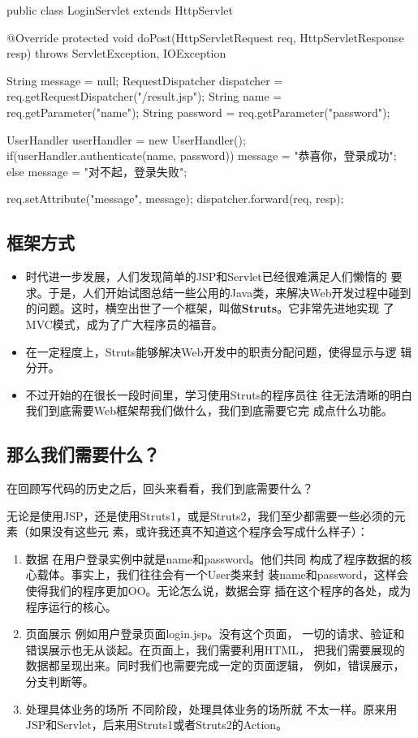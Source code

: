 \begin{javaCode}
  public class LoginServlet extends HttpServlet {
    
    @Override
    protected void doPost(HttpServletRequest req, HttpServletResponse resp) 
    throws ServletException, IOException {
      String message = null;
      RequestDispatcher dispatcher = req.getRequestDispatcher("/result.jsp");
      String name = req.getParameter("name");
      String password = req.getParameter("password");
      
      UserHandler userHandler = new UserHandler();
      if(userHandler.authenticate(name, password)) {
        message = "恭喜你，登录成功";
      } else {
        message = "对不起，登录失败";
      }
      
      req.setAttribute("message", message);
      dispatcher.forward(req, resp);
    }
  }
\end{javaCode}

\subsection{框架方式}

\begin{itemize}
\item 时代进一步发展，人们发现简单的JSP和Servlet已经很难满足人们懒惰的
  要求。于是，人们开始试图总结一些公用的Java类，来解决Web开发过程中碰到
  的问题。这时，横空出世了一个框架，叫做{\bf\Red Struts}。它非常先进地实现
  了{\hei\Red MVC模式}，成为了广大程序员的福音。
\item 在一定程度上，Struts能够解决Web开发中的职责分配问题，使得显示与逻
  辑分开。
\item {\Blue\kai 不过开始的在很长一段时间里，学习使用Struts的程序员往
    往无法清晰的明白我们到底需要Web框架帮我们做什么，我们到底需要它完
    成点什么功能。}
\end{itemize}

\subsection{那么我们需要什么？}

在回顾写代码的历史之后，回头来看看，我们到底需要什么？ 

无论是使用JSP，还是使用Struts1，或是Struts2，我们至少都需要一些必须的元素（如果没有这些元
素，或许我还真不知道这个程序会写成什么样子）：

\begin{enumerate}
\item {\hei 数据} {在用户登录实例中就是name和password。他们共同
    构成了程序数据的核心载体。事实上，我们往往会有一个User类来封
    装name和password，这样会使得我们的程序更加OO。无论怎么说，数据会穿
    插在这个程序的各处，成为程序运行的核心。 }
\item {\hei 页面展示} {例如用户登录页面login.jsp。没有这个页面，
    一切的请求、验证和错误展示也无从谈起。在页面上，我们需要利用HTML，
    把我们需要展现的数据都呈现出来。同时我们也需要完成一定的页面逻辑，
    例如，错误展示，分支判断等。 }
\item {\hei 处理具体业务的场所} {不同阶段，处理具体业务的场所就
    不太一样。原来用JSP和Servlet，后来用Struts1或者Struts2的Action。}
\end{enumerate}

